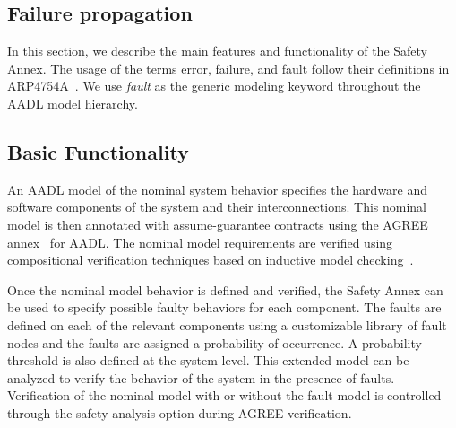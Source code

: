 \subsection{Failure propagation}







In this section, we describe the main features and functionality of the Safety Annex. The usage of the terms error, failure, and fault follow their definitions in ARP4754A~\cite{SAE:ARP4754A}. We use {\em fault} as the generic modeling keyword throughout the AADL model hierarchy.

\subsection{Basic Functionality}

An AADL model of the nominal system behavior specifies the hardware and software components of the system and their interconnections. This nominal model is then annotated with assume-guarantee contracts using the AGREE annex~\cite{NFM2012:CoGaMiWhLaLu} for AADL. The nominal model requirements are verified using compositional verification techniques based on inductive model checking~\cite{2017arXiv171201222G}.

Once the nominal model behavior is defined and verified, the Safety Annex can be used to specify possible faulty behaviors for each component. The faults are defined on each of the relevant components using a customizable library of fault nodes and the faults are assigned a probability of occurrence. A probability threshold is also defined at the system level. This extended model can be analyzed to verify the behavior of the system in the presence of faults. Verification of the nominal model with or without the fault model is controlled through the safety analysis option during AGREE verification.

